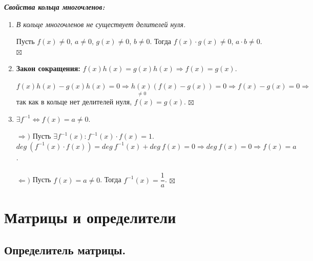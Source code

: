 \documentclass[a4paper, 12pt]{report}
\newenvironment{Proof} %
{\par\noindent{$\blacklozenge$}} %
{\hfill$\scriptstyle\boxtimes$}
\begin{document}
\textbf{\textit{Свойства кольца многочленов:}}\begin{enumerate}
	\item \textit{В кольце многочленов не существует делителей нуля.}
	\begin{Proof}
		Пусть $f(x) \ne 0$, $a \ne 0$, $g(x) \ne 0$, $b\ne 0$. Тогда $f(x)\cdot g(x) \ne 0$, $a\cdot b\ne 0$.
	\end{Proof}
	\item \textbf{Закон сокращения:}
	$f(x)h(x) = g(x)h(x)\Rightarrow f(x) = g(x)$.
	\begin{Proof}
		$f(x)h(x) - g(x)h(x) = 0 \Rightarrow \underset{\ne0}{h(x)}(f(x) - g(x)) = 0\Rightarrow f(x) - g(x) = 0 \Rightarrow $ так как в кольце нет делителей нуля, $f(x) = g(x).$
	\end{Proof}
	\item $\exists f^{-1} \Longleftrightarrow f(x) = a \ne 0$.
	\begin{Proof}
		$\Rightarrow)$ Пусть $\exists f^{-1}(x) : f^{-1}(x)\cdot f(x) = 1$.\\
		$deg\ (f^{-1}(x)\cdot f(x)) = deg\ f^{-1}(x) + deg\ f(x) = 0\Rightarrow deg\ f(x) = 0\Rightarrow f(x) = a$.\\\\
		$\Leftarrow)$ Пусть $f(x) = a \ne 0$. Тогда $f^{-1}(x) = \dfrac{1}{a}$. 
	\end{Proof}
\end{enumerate}
	
	
	
	
	
	\chapter{Матрицы и определители}
	\section{Определитель матрицы.}
	
\end{document}
